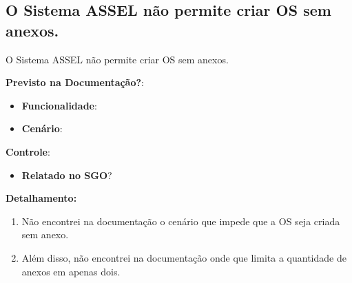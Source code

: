 


\subsection{O Sistema ASSEL não permite criar OS sem anexos.}
\begin{falha}[1]{O Sistema ASSEL não permite criar OS sem anexos.}
	
	
	
	\textbf{Previsto na Documentação?}: \mscheckint
	\begin{itemize}
		\item \textbf{Funcionalidade}: \mscheckint
		\item \textbf{Cenário}: \mscheckint
	\end{itemize}

	
	\textbf{Controle}:
	\begin{itemize}
		\item \textbf{Relatado no SGO}? \mschecksim %
	\end{itemize}
	
	
	\tcblower
	
	\textbf{Detalhamento:}
	\begin{enumerate}
		\item Não encontrei na documentação o cenário que impede que a OS seja criada sem anexo.
		\item Além disso, não encontrei na documentação onde que limita a quantidade de anexos em apenas dois.
	\end{enumerate}
	

	
\end{falha}






